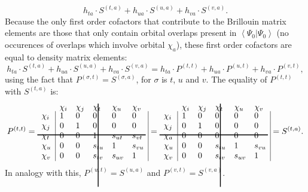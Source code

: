 \begin{equation}
h_{ta} \cdot S^{(t,a)} + h_{ua} \cdot S^{(u,a)} + h_{va} \cdot S^{(v,a)}.
\label{ch2.eq.ta_1el2}
\end{equation}
Because the only first order cofactors that contribute to the Brillouin matrix elements are those that only contain orbital overlaps present in $\left< \Psi_0 | \Psi_0 \right>$ (no occurences of overlaps which involve orbital $\chi_a$), these first order cofactors are equal to density matrix elements:
\begin{equation}
h_{ta} \cdot S^{(t,a)} + h_{ua} \cdot S^{(u,a)} + h_{va} \cdot S^{(v,a)} = h_{ta} \cdot P^{(t,t)} + h_{ua} \cdot P^{(u,t)} + h_{va} \cdot P^{(v,t)},
\label{ch2.eq.ta_i1}
\end{equation}
using the fact that $P^{(\sigma,t)} = S^{(\sigma,a)}$, for $\sigma$ is $t$, $u$ and $v$. The equality of $P^{(t,t)}$ with $S ^{(t,a)}$ is:
\begin{equation}
P^{(t,t)}=
\begin{array}{llllll}
 & \hskip 46.0 pt \hbox{\lower 93pt\hbox{\vrule height100pt width 1.0pt}}\hskip-47.0pt \chi_i & \chi_j & \chi_t & \chi_u & \chi_v \\
 \noalign{\vskip-91pt}
 \chi_i &  \multicolumn{1}{|l}{ 1 } & 0 & 0 & 0 & \multicolumn{1}{l|}{ 0 } \\
 \chi_j & \multicolumn{1}{|l}{ 0 } & 1 & 0 & 0 & \multicolumn{1}{l|}{ 0 } \\
 \chi_t & \multicolumn{1}{|l}{ 0 } & 0 & 1 & s_{ut} & \multicolumn{1}{l|}{s_{vt}} \\
 \noalign{\vskip-8pt}
 \multispan6\hbox{\vrule  height 1.0 pt width130pt}\cr
 \noalign{\vskip 7pt}
 \chi_u & \multicolumn{1}{|l}{ 0 } & 0 & s_{tu} & 1 & \multicolumn{1}{l|}{s_{vu}} \\
 \chi_v & \multicolumn{1}{|l}{ 0 } & 0 & s_{tv} & s_{uv} & \multicolumn{1}{l|}{ 1 }
\end{array} =
\begin{array}{llllll}
 & \hskip 46.0 pt \hbox{\lower 93pt\hbox{\vrule height100pt width 1.0pt}}\hskip-47.0pt \chi_i & \chi_j & \chi_t & \chi_u & \chi_v \\
 \noalign{\vskip-91pt}
 \chi_i &  \multicolumn{1}{|l}{ 1 } & 0 & 0 & 0 & \multicolumn{1}{l|}{ 0 } \\
 \chi_j & \multicolumn{1}{|l}{ 0 } & 1 & 0 & 0 & \multicolumn{1}{l|}{ 0 } \\
 \chi_a & \multicolumn{1}{|l}{ 0 } & 0 & 0 & 0 & \multicolumn{1}{l|}{ 0 } \\
 \noalign{\vskip-8pt}
 \multispan6\hbox{\vrule  height 1.0 pt width130pt}\cr
 \noalign{\vskip 7pt}
 \chi_u & \multicolumn{1}{|l}{ 0 } & 0 & s_{tu} & 1 & \multicolumn{1}{l|}{s_{vu}} \\
 \chi_v & \multicolumn{1}{|l}{ 0 } & 0 & s_{tv} & s_{uv} & \multicolumn{1}{l|}{ 1 }
\end{array}=S^{(t,a)}.
\label{ch2.eq.p_is_s}
\end{equation}
In analogy with this, $P^{(u,t)}=S^{(u,a)}$ and $P^{(v,t)}=S^{(v,a)}$. 


